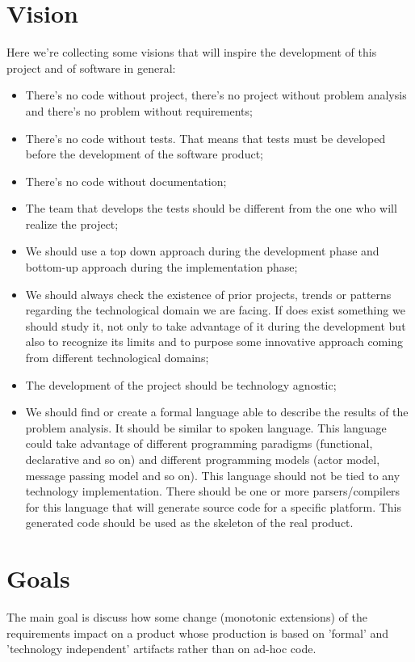 \documentclass{llncs}
\newcommand{\labelsec}[1]{\label{sec:#1}}
\begin{document}
\section{Vision}
\labelsec{Vision}
Here we're collecting some visions that will inspire the development of this project and of software in general:\\
\begin{itemize}
	\item There's no code without project, there's no project without problem analysis and there's no problem without requirements;
	\item There's no code without tests. That means that tests must be developed before the development of the software product;
	\item There's no code without documentation;
	\item The team that develops the tests should be different from the one who will realize the project;
	\item We should use a top down approach during the development phase and bottom-up approach during the implementation phase;
	\item We should always check the existence of prior projects, trends or patterns regarding the technological domain we are facing. If does exist something we should study it, not only to take advantage of it during the development but also to recognize its limits and to purpose some innovative approach coming from different technological domains;
	\item The development of the project should be technology agnostic;
	\item We should find or create a formal language able to describe the results of the problem analysis. It should be similar to spoken language. This language could take advantage of different programming paradigms (functional, declarative and so on) and different programming models (actor model, message passing model and so on). This language should not be tied to any technology implementation. There should be one or more parsers/compilers for this language that will generate source code for a specific platform. This generated code should be used as the skeleton of the real product.
\end{itemize}

\section{Goals}
The main goal is discuss how some change (monotonic extensions) of the requirements impact on a product whose production is based on 'formal' and 'technology independent' artifacts rather than on ad-hoc code.
\labelsec{Goals}
\end{document}
